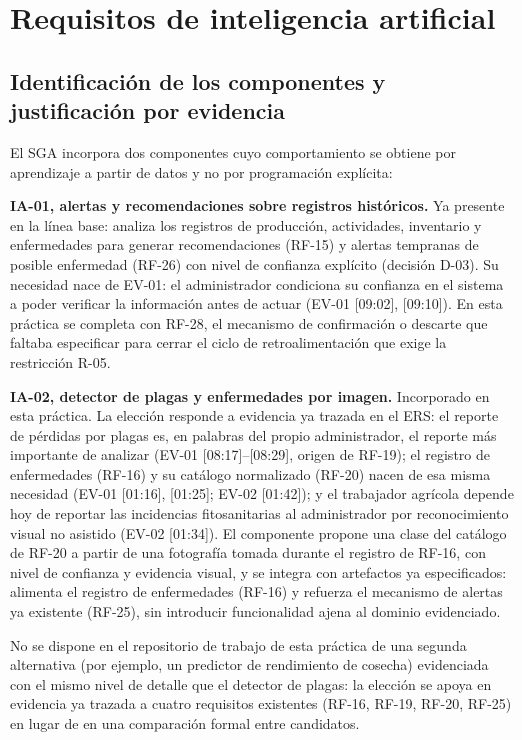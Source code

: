 \section{Requisitos de inteligencia artificial}
\label{sec:informe-ia}

\subsection{Identificación de los componentes y justificación por evidencia}

El SGA incorpora dos componentes cuyo comportamiento se obtiene por aprendizaje a partir de datos y no por programación explícita:

\textbf{IA-01, alertas y recomendaciones sobre registros históricos.} Ya presente en la línea base: analiza los registros de producción, actividades, inventario y enfermedades para generar recomendaciones (RF-15) y alertas tempranas de posible enfermedad (RF-26) con nivel de confianza explícito (decisión D-03). Su necesidad nace de EV-01: el administrador condiciona su confianza en el sistema a poder verificar la información antes de actuar (EV-01 [09:02], [09:10]). En esta práctica se completa con RF-28, el mecanismo de confirmación o descarte que faltaba especificar para cerrar el ciclo de retroalimentación que exige la restricción R-05.

\textbf{IA-02, detector de plagas y enfermedades por imagen.} Incorporado en esta práctica. La elección responde a evidencia ya trazada en el ERS: el reporte de pérdidas por plagas es, en palabras del propio administrador, el reporte más importante de analizar (EV-01 [08:17]--[08:29], origen de RF-19); el registro de enfermedades (RF-16) y su catálogo normalizado (RF-20) nacen de esa misma necesidad (EV-01 [01:16], [01:25]; EV-02 [01:42]); y el trabajador agrícola depende hoy de reportar las incidencias fitosanitarias al administrador por reconocimiento visual no asistido (EV-02 [01:34]). El componente propone una clase del catálogo de RF-20 a partir de una fotografía tomada durante el registro de RF-16, con nivel de confianza y evidencia visual, y se integra con artefactos ya especificados: alimenta el registro de enfermedades (RF-16) y refuerza el mecanismo de alertas ya existente (RF-25), sin introducir funcionalidad ajena al dominio evidenciado.

No se dispone en el repositorio de trabajo de esta práctica de una segunda alternativa (por ejemplo, un predictor de rendimiento de cosecha) evidenciada con el mismo nivel de detalle que el detector de plagas: la elección se apoya en evidencia ya trazada a cuatro requisitos existentes (RF-16, RF-19, RF-20, RF-25) en lugar de en una comparación formal entre candidatos.

